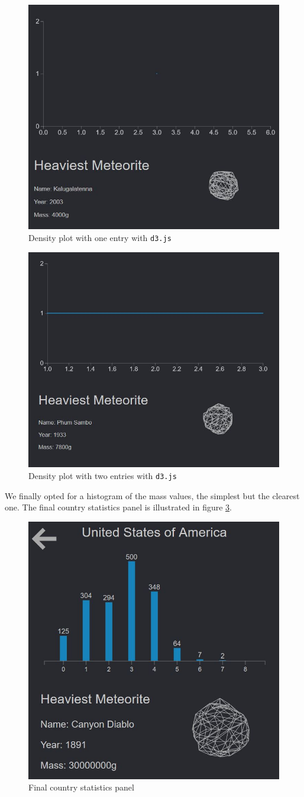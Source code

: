 \documentclass[10pt,conference,compsocconf]{IEEEtran}
\begin{document}
\begin{figure}[]
  \centering
  \includegraphics[width=.5\columnwidth]{images/one_point_density_plot}
  \caption{Density plot with one entry with \texttt{d3.js}}
  \label{fig:density_one}
\end{figure}

\begin{figure}[]
  \centering
  \includegraphics[width=.5\columnwidth]{images/two_point_density_plot}
  \caption{Density plot with two entries with \texttt{d3.js}}
  \label{fig:density_two}
\end{figure}

We finally opted for a histogram of the mass values, the simplest but the clearest one.
The final country statistics panel is illustrated in figure \ref{fig:country_statistics_final}. 

\begin{figure}[H]
  \centering
  \includegraphics[width=.7\columnwidth]{images/country_statistics_final}
  \caption{Final country statistics panel}
  \label{fig:country_statistics_final}
\end{figure}
\end{document}
